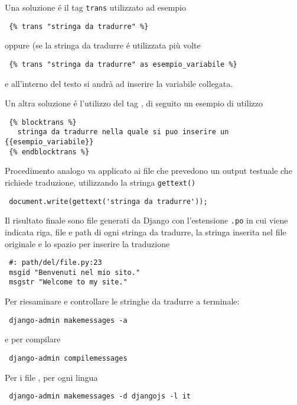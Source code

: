 Una soluzione é il tag \texttt{trans} utilizzato ad esempio
\begin{footnotesize}
\begin{verbatim}
 {% trans "stringa da tradurre" %}
\end{verbatim}
\end{footnotesize}
oppure (se la stringa da tradurre é utilizzata più volte
\begin{footnotesize}
\begin{verbatim}
 {% trans "stringa da tradurre" as esempio_variabile %}
\end{verbatim}
\end{footnotesize}
e all'interno del testo si andrà ad inserire la variabile collegata.

Un altra soluzione é l'utilizzo del tag , di seguito un esempio di utilizzo
\begin{footnotesize}
\begin{verbatim}
 {% blocktrans %} 
   stringa da tradurre nella quale si puo inserire un {{esempio_variabile}}
 {% endblocktrans %}
\end{verbatim}
\end{footnotesize}

Procedimento analogo va applicato ai file {\js} che prevedono un output testuale che richiede traduzione, utilizzando la stringa \texttt{gettext()}
\begin{footnotesize}
\begin{verbatim}
 document.write(gettext('stringa da tradurre'));
\end{verbatim}
\end{footnotesize}

Il risultato finale sono file generati da Django con l'estensione \texttt{.po} in cui viene indicata riga, file e path di ogni stringa da tradurre, la stringa inserita nel file originale e lo spazio per inserire la traduzione
\begin{footnotesize}
\begin{verbatim}
 #: path/del/file.py:23
 msgid "Benvenuti nel mio sito."
 msgstr "Welcome to my site."
\end{verbatim}
\end{footnotesize}

Per riesaminare e controllare le stringhe da tradurre a terminale:
\begin{footnotesize}
\begin{verbatim}
 django-admin makemessages -a
\end{verbatim}
\end{footnotesize}
e per compilare
\begin{footnotesize}
\begin{verbatim}
 django-admin compilemessages
\end{verbatim}
\end{footnotesize}

Per i file {\js}, per ogni lingua
\begin{footnotesize}
\begin{verbatim}
 django-admin makemessages -d djangojs -l it
\end{verbatim}
\end{footnotesize}
